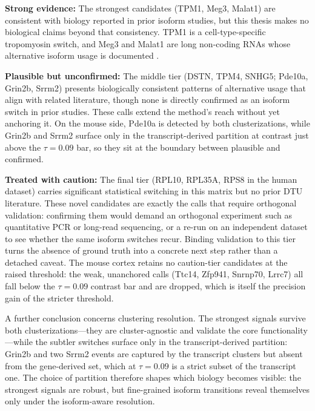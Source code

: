 \textbf{Strong evidence:} The strongest candidates (TPM1, Meg3, Malat1) are consistent with biology reported in prior isoform studies, but this thesis makes no biological claims beyond that consistency. TPM1 is a cell-type-specific tropomyosin switch, and Meg3 and Malat1 are long non-coding RNAs whose alternative isoform usage is documented \cite{uroda2019meg3, ghanam2023malat1, xue2012specialized}.

\textbf{Plausible but unconfirmed:} The middle tier (DSTN, TPM4, SNHG5; Pde10a, Grin2b, Srrm2) presents biologically consistent patterns of alternative usage that align with related literature, though none is directly confirmed as an isoform switch in prior studies. These calls extend the method's reach without yet anchoring it. On the mouse side, Pde10a is detected by both clusterizations, while Grin2b and Srrm2 surface only in the transcript-derived partition at contrast just above the $\tau = 0.09$ bar, so they sit at the boundary between plausible and confirmed.

\textbf{Treated with caution:} The final tier (RPL10, RPL35A, RPS8 in the human dataset) carries significant statistical switching in this matrix but no prior DTU literature. These novel candidates are exactly the calls that require orthogonal validation: confirming them would demand an orthogonal experiment such as quantitative PCR or long-read sequencing, or a re-run on an independent dataset to see whether the same isoform switches recur. Binding validation to this tier turns the absence of ground truth into a concrete next step rather than a detached caveat. The mouse cortex retains no caution-tier candidates at the raised threshold: the weak, unanchored calls (Ttc14, Zfp941, Snrnp70, Lrrc7) all fall below the $\tau = 0.09$ contrast bar and are dropped, which is itself the precision gain of the stricter threshold.

A further conclusion concerns clustering resolution. The strongest signals survive both clusterizations---they are cluster-agnostic and validate the core functionality---while the subtler switches surface only in the transcript-derived partition: Grin2b and two Srrm2 events are captured by the transcript clusters but absent from the gene-derived set, which at $\tau = 0.09$ is a strict subset of the transcript one. The choice of partition therefore shapes which biology becomes visible: the strongest signals are robust, but fine-grained isoform transitions reveal themselves only under the isoform-aware resolution.

